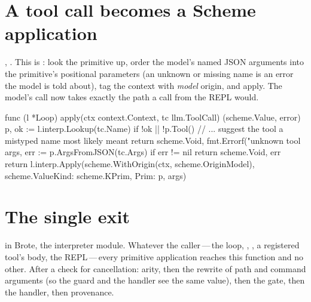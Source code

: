 \section{A tool call becomes a Scheme application}

, . This is : look the
primitive up, order the model's named JSON arguments into the primitive's
positional parameters (an unknown or missing name is an error the model is
told about), tag the context with \emph{model} origin, and apply. The
model's call now takes exactly the path a call from the REPL would.

\begin{go}
func (l *Loop) apply(ctx context.Context, tc llm.ToolCall) (scheme.Value, error) {
    p, ok := l.interp.Lookup(tc.Name)
    if !ok || !p.Tool() {
        // ... suggest the tool a mistyped name most likely meant
        return scheme.Void, fmt.Errorf("unknown tool %
    }
    args, err := p.ArgsFromJSON(tc.Args)
    if err != nil {
        return scheme.Void, err
    }
    return l.interp.Apply(scheme.WithOrigin(ctx, scheme.OriginModel), scheme.Value{Kind: scheme.KPrim, Prim: p}, args)
}
\end{go}

\section{The single exit}

 in Brote, the interpreter module. Whatever the caller\,---\,the loop,
, , a registered tool's body, the REPL\,---\,every
primitive application reaches this function and no other. After a check
for cancellation: arity, then the  rewrite of path and
command arguments (so the guard and the handler see the same value), then
the gate, then the handler, then provenance.

